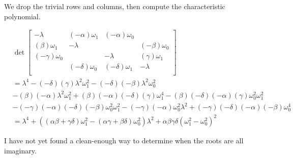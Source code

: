 \documentclass{article}
\begin{document}

We drop the trivial rows and columns, then compute the characteristic polynomial.

\begin{align*}
    &\det \begin{bmatrix}
        -\lambda & (-\alpha)\omega_1 & (-\alpha)\omega_0 & \\
        (\beta)\omega_1 & -\lambda & & (-\beta)\omega_0 \\
        (-\gamma)\omega_0 & & -\lambda & (\gamma)\omega_1 \\
        & (-\delta)\omega_0 & (-\delta)\omega_1 & -\lambda \\
    \end{bmatrix}
    \\ &= \lambda^4 - (-\delta)(\gamma) \lambda^2\omega_1^2 - (-\delta)(-\beta) \lambda^2\omega_0^2
    \\ &- (\beta)(-\alpha)\lambda^2\omega_1^2 + (\beta)(-\alpha)(-\delta)(\gamma) \omega_1^4 - (\beta)(-\delta)(-\alpha)(\gamma)\omega_0^2\omega_1^2
    \\ &- (-\gamma)(-\alpha)(-\delta)(-\beta)\omega_0^2\omega_1^2 - (-\gamma)(-\alpha)\omega_0^2\lambda^2 + (-\gamma)(-\delta)(-\alpha)(-\beta)\omega_0^4
    \\ &= \lambda^4 + ((\alpha\beta + \gamma\delta)\omega_1^2 - (\alpha\gamma + \beta\delta) \omega_0^2)\lambda^2 + \alpha\beta\gamma\delta (\omega_1^2 - \omega_0^2)^2
\end{align*}

\pagebreak

I have not yet found a clean-enough way to determine when the roots are all imaginary.



\end{document}

